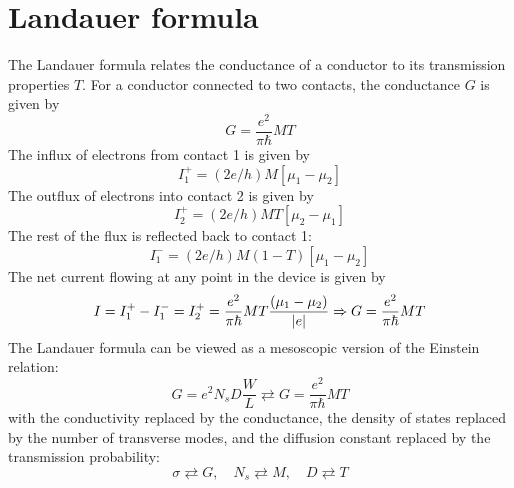 \documentclass[11pt,a4paper]{book}
\theoremstyle{plain}
\theoremstyle{definition}
\theoremstyle{remark}
\begin{document}
\section{Landauer formula}
The Landauer formula relates the conductance of a conductor to its transmission properties $T$. For a conductor connected to two contacts, the conductance $G$ is given by
\begin{equation}
    G = \frac{e^2}{\pi \hbar} M T
\end{equation}
The influx of electrons from contact 1 is given by
\begin{equation}
    I^+_1=(2 e/h) M [\mu_1 - \mu_2]
\end{equation}
The outflux of electrons into contact 2 is given by
\begin{equation}
    I^+_2=(2 e/h) M T [\mu_2 - \mu_1]
\end{equation}
The rest of the flux is reflected back to contact 1:
\begin{equation}
    I^-_1=(2 e/h) M (1-T) [\mu_1 - \mu_2]
\end{equation}
The net current flowing at any point in the device is given by
\begin{equation}
    I = I^+_1 - I^-_1 = I^+_2 = \frac{e^2}{\pi \hbar} M T \frac{(\mu_1 - \mu_2)}{\abs{e}} \Rightarrow G = \frac{e^2}{\pi \hbar} M T
\end{equation}
The Landauer formula can be viewed as a mesoscopic version of the Einstein relation:
\begin{equation}
    G = e^2 N_s D \frac{W}{L} \rightleftarrows G = \frac{e^2}{\pi \hbar} M T
\end{equation}
with the conductivity replaced by the conductance, the density of states replaced by the number of transverse modes, and the diffusion constant replaced by the transmission probability:
\begin{equation}
    \sigma \rightleftarrows G, \quad N_s \rightleftarrows M, \quad D \rightleftarrows T
\end{equation}
\end{document}
